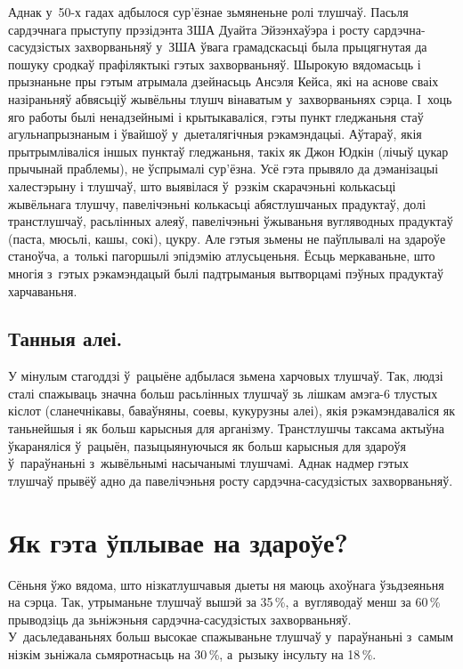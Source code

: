 Аднак у~50-х гадах адбылося сур'ёзнае зьмяненьне ролі тлушчаў. Пасьля сардэчнага прыступу прэзідэнта ЗША Дуайта Эйзэнхаўэра і росту сардэчна-сасудзістых захворваньняў у~ЗША ўвага грамадскасьці была прыцягнутая да пошуку сродкаў прафіляктыкі гэтых захворваньняў. Шырокую вядомасьць і прызнаньне пры гэтым атрымала дзейнасьць Ансэля Кейса, які на аснове сваіх назіраньняў абвясьціў жывёльны тлушч вінаватым у~захворваньнях сэрца. І~хоць яго работы былі ненадзейнымі і крытыкаваліся, гэты пункт гледжаньня стаў агульнапрызнаным і ўвайшоў у~дыеталягічныя рэкамэндацыі. Аўтараў, якія прытрымліваліся іншых пунктаў гледжаньня, такіх як Джон Юдкін (лічыў цукар прычынай праблемы), не ўспрымалі сур'ёзна. Усё гэта прывяло да дэманізацыі халестэрыну і тлушчаў, што выявілася ў~рэзкім скарачэньні колькасьці жывёльнага тлушчу, павелічэньні колькасьці абястлушчаных прадуктаў, долі транстлушчаў, расьлінных алеяў, павелічэньні ўжываньня вугляводных прадуктаў (паста, мюсьлі, кашы, сокі), цукру. Але гэтыя зьмены не паўплывалі на здароўе станоўча, а~толькі пагоршылі эпідэмію атлусьценьня. Ёсьць меркаваньне, што многія з~гэтых рэкамэндацый былі падтрыманыя вытворцамі пэўных прадуктаў харчаваньня.


\subsection{Танныя алеі.}
У мінулым стагоддзі ў~рацыёне адбылася зьмена харчовых тлушчаў. Так, людзі сталі спажываць значна больш расьлінных тлушчаў зь лішкам амэга-6 тлустых кіслот (сланечнікавы, баваўняны, соевы, кукурузны алеі), якія рэкамэндаваліся як таньнейшыя і як больш карысныя для арганізму. Транстлушчы таксама актыўна ўкараняліся ў~рацыён, пазыцыянуючыся як больш карысныя для здароўя ў~параўнаньні з~жывёльнымі насычанымі тлушчамі. Аднак надмер гэтых тлушчаў прывёў адно да павелічэньня росту сардэчна-сасудзістых захворваньняў.

\section{Як гэта ўплывае на здароўе?}

Сёньня ўжо вядома, што нізкатлушчавыя дыеты ня маюць ахоўнага ўзьдзеяньня на сэрца. Так, утрыманьне тлушчаў вышэй за 35\,\%, а~вугляводаў менш за 60\,\% прыводзіць да зьніжэньня сардэчна-сасудзістых захворваньняў. У~дасьледаваньнях больш высокае спажываньне тлушчаў у~параўнаньні з~самым нізкім зьніжала сьмяротнасьць на 30\,\%, а~рызыку інсульту на 18\,\%.

